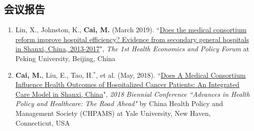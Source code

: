 \documentclass[11pt, a4paper]{article}
\newcommand{\years}[1]{\marginnote{\scriptsize #1}}
\begin{document}
	
	\subsection*{会议报告}
	\begin{enumerate}[leftmargin=0ex,itemsep=1ex]
		\item \years{2019}Lin, X., Johnston, K., \textbf{Cai, M.} (March 2019). ``\ul{Does the medical consortium reform improve hospital efficiency? Evidence from secondary general hospitals in Shanxi, China, 2013-2017}", \emph{The 1st Health Economics and Policy Forum} at Peking University, Beijing, China
		
		\item \years{2018}\textbf{Cai, M.}, Liu, E., Tao, H.$^\ast$, et al. (May, 2018). ``\ul{Does A Medical Consortium Influence Health Outcomes of Hospitalized Cancer Patients: An Integrated Care Model in Shanxi, China}", \emph{2018 Biennial Conference ``Advances in Health Policy and Healthcare: The Road Ahead"} by China Health Policy and Management Society (CHPAMS) at Yale University, New Haven, Connecticut, USA
	\end{enumerate}
	
	
	
\end{document}
